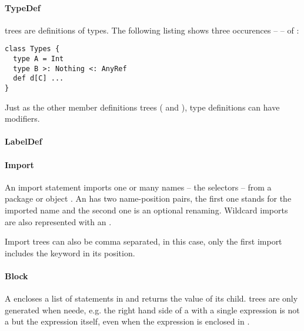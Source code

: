 \paragraph{TypeDef} 

\noindent {} trees are definitions of types. The following listing shows three occurences --  -- of :

\begin{lstlisting}
class Types {
  type A = Int
  type B >: Nothing <: AnyRef
  def d[C] ...
}
\end{lstlisting}

Just as the other member definitions trees ( and ), type definitions can have modifiers.

\paragraph{LabelDef} 

\noindent %

\paragraph{Import} 

\noindent An import statement imports one or many names -- the selectors -- from a package or object . An  has two name-position pairs, the first one stands for the imported name and the second one is an optional renaming. Wildcard imports are also represented with an .

Import trees can also be comma separated, in this case, only the first import includes the  keyword in its position.

\paragraph{Block} 

\noindent A  encloses a list of statements in \src{\{ \ldots \}} and returns the value of its  child.  trees are only generated when neede, e.g. the right hand side of a  with a single expression is not a  but the expression itself, even when the expression is enclosed in \src{\{ \ldots \}}.

